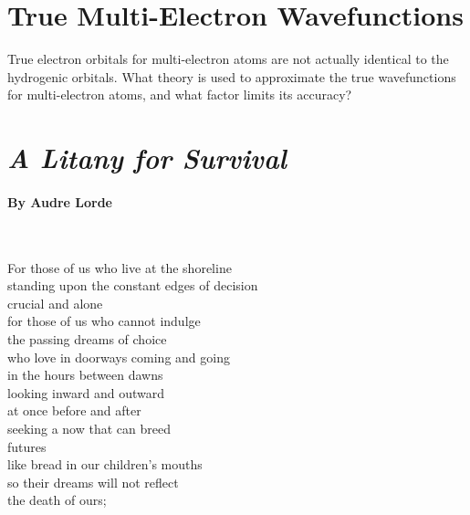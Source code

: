 \documentclass[11pt, letterpaper]{memoir}
\begin{document}
{\section*{True Multi-Electron Wavefunctions}
True electron orbitals for multi-electron atoms are not actually identical to the hydrogenic orbitals. What theory is used to approximate the true wavefunctions for multi-electron atoms, and what factor limits its accuracy?

\newpage
\pagestyle{empty}
\addtocounter{page}{-1}
\section*{\emph{A Litany for Survival}}
\paragraph{By Audre Lorde}~

\vspace{1em}\noindent
\begin{minipage}[t]{0.56\linewidth}
	For those of us who live at the shoreline\\
	standing upon the constant edges of decision\\
	crucial and alone\\
	for those of us who cannot indulge\\
	the passing dreams of choice\\
	who love in doorways coming and going\\
	in the hours between dawns\\
	looking inward and outward\\
	at once before and after\\
	seeking a now that can breed\\
	futures\\
	like bread in our children’s mouths\\
	so their dreams will not reflect\\
	the death of ours;


\end{minipage}}
\end{document}
